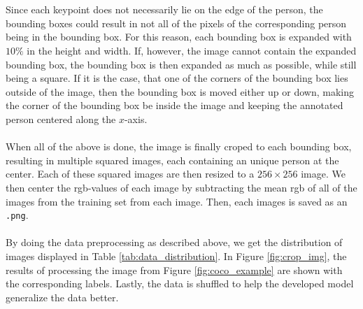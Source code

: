 \documentclass[./main.tex]{subfiles}
\begin{document}
\\
\\
Since each keypoint does not necessarily lie on the edge of the person, the bounding boxes could result in not all of the pixels of the corresponding person being in the bounding box. For this reason, each bounding box is expanded with $10\%$ in the height and width. If, however, the image cannot contain the expanded bounding box, the bounding box is then expanded as much as possible, while still being a square. If it is the case, that one of the corners of the bounding box lies outside of the image, then the bounding box is moved either up or down, making the corner of the bounding box be inside the image and keeping the annotated person centered along the $x$-axis. 
\\
\\
When all of the above is done, the image is finally croped to each bounding box, resulting in multiple squared images, each containing an unique person at the center. Each of these squared images are then resized to a $256 \times 256$ image. We then center the rgb-values of each image by subtracting the mean rgb of all of the images from the training set from each image. Then, each images is saved as an \texttt{.png}.
\\
\\
By doing the data preprocessing as described above, we get the distribution of images displayed in Table \ref{tab:data_distribution}. In Figure \ref{fig:crop_img}, the results of processing the image from Figure \ref{fig:coco_example} are shown with the corresponding labels. Lastly, the data is shuffled to help the developed model generalize the data better.
\end{document}
